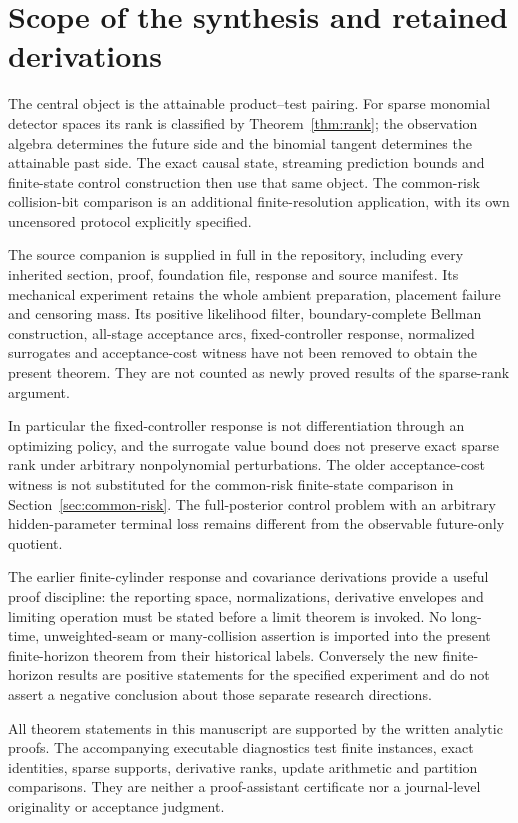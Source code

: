 \section{Scope of the synthesis and retained derivations}\label{sec:scope}
The central object is the attainable product--test pairing. For sparse
monomial detector spaces its rank is classified by
Theorem~\ref{thm:rank}; the observation algebra determines the future
side and the binomial tangent determines the attainable past side. The
exact causal state, streaming prediction bounds and finite-state control
construction then use that same object. The common-risk collision-bit
comparison is an additional finite-resolution application, with its own
uncensored protocol explicitly specified.

The source companion \cite{A1v5} is supplied in full in the repository,
including every inherited section, proof, foundation file, response and
source manifest. Its mechanical experiment retains the whole ambient
preparation, placement failure and censoring mass. Its positive likelihood
filter, boundary-complete Bellman construction, all-stage acceptance arcs,
fixed-controller response, normalized surrogates and acceptance-cost witness
have not been removed to obtain the present theorem. They are not counted
as newly proved results of the sparse-rank argument.

In particular the fixed-controller response is not differentiation through
an optimizing policy, and the surrogate value bound does not preserve
exact sparse rank under arbitrary nonpolynomial perturbations. The older
acceptance-cost witness is not substituted for the common-risk finite-state
comparison in Section~\ref{sec:common-risk}. The full-posterior control
problem with an arbitrary hidden-parameter terminal loss remains different
from the observable future-only quotient.

The earlier finite-cylinder response and covariance derivations
\cite{A1round33} provide a useful proof discipline: the reporting space,
normalizations, derivative envelopes and limiting operation must be stated
before a limit theorem is invoked. No long-time, unweighted-seam or
many-collision assertion is imported into the present finite-horizon theorem
from their historical labels. Conversely the new finite-horizon results
are positive statements for the specified experiment and do not assert a
negative conclusion about those separate research directions.

All theorem statements in this manuscript are supported by the written
analytic proofs. The accompanying executable diagnostics test finite
instances, exact identities, sparse supports, derivative ranks, update
arithmetic and partition comparisons. They are neither a proof-assistant
certificate nor a journal-level originality or acceptance judgment.
